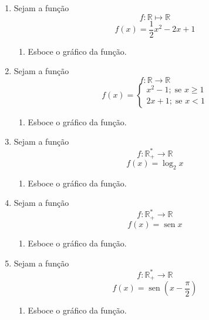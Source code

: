 \documentclass[12pt,a4paper]{article}
\DeclareMathOperator{\sen}{sen}
\begin{document}
    \begin{enumerate}


        \item Sejam a função $$f : \mathbb{R} \mapsto \mathbb{R}$$ 
        $$f(x)=\dfrac{1}{2}x^2 - 2x +1$$
        \begin{enumerate}
            \item Esboce o gráfico da função.
        \end{enumerate}


        \item Sejam a função $$f : \mathbb{R} \to \mathbb{R}$$
        $$f(x)=
            \begin{cases}
                x^2 - 1;\;\textrm{se }x \geq 1\\
                2x+1;\;\textrm{se }x<1
            \end{cases}    
        $$
        \begin{enumerate}
            \item Esboce o gráfico da função.
        \end{enumerate}
        
        \item Sejam a função $$f : \mathbb{R}^*_+ \to \mathbb{R}$$
        $$f(x) = \log_2 x$$
        \begin{enumerate}
            \item Esboce o gráfico da função.
        \end{enumerate}
        
     
        \item Sejam a função $$f : \mathbb{R}^*_+ \to \mathbb{R}$$
        $$f(x) = \sen x$$
        \begin{enumerate}
            \item Esboce o gráfico da função.
        \end{enumerate}
        
    \item Sejam a função $$f : \mathbb{R}^*_+ \to \mathbb{R}$$
        $$f(x) = \sen (x-\dfrac{\pi}{2})$$
        \begin{enumerate}
            \item Esboce o gráfico da função.
        \end{enumerate}
        
    
    \end{enumerate}
\end{document}

